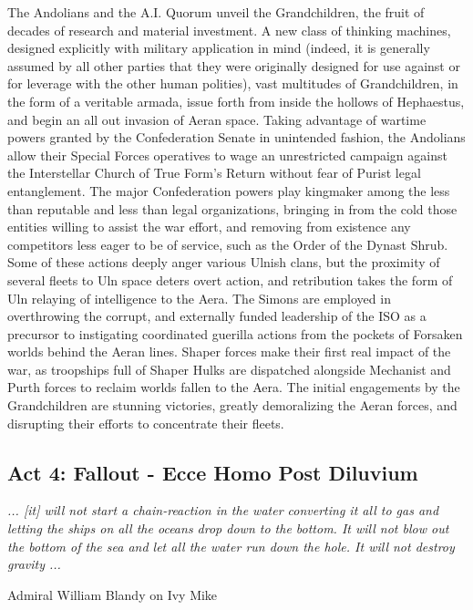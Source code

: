 The Andolians and the A.I. Quorum unveil the Grandchildren, the fruit
of decades of research and material investment. A new class of
thinking machines, designed explicitly with military application in
mind (indeed, it is generally assumed by all other parties that they
were originally designed for use against or for leverage with the
other human polities), vast multitudes of Grandchildren, in the form
of a veritable armada, issue forth from inside the hollows of
Hephaestus, and begin an all out invasion of Aeran space. Taking
advantage of wartime powers granted by the Confederation Senate in
unintended fashion, the Andolians allow their Special Forces
operatives to wage an unrestricted campaign against the Interstellar
Church of True Form's Return without fear of Purist legal
entanglement. The major Confederation powers play kingmaker among the
less than reputable and less than legal organizations, bringing in
from the cold those entities willing to assist the war effort, and
removing from existence any competitors less eager to be of service,
such as the Order of the Dynast Shrub. Some of these actions deeply
anger various Ulnish clans, but the proximity of several fleets to Uln
space deters overt action, and retribution takes the form of Uln
relaying of intelligence to the Aera. The Simons are employed in
overthrowing the corrupt, and externally funded leadership of the ISO
as a precursor to instigating coordinated guerilla actions from the
pockets of Forsaken worlds behind the Aeran lines. Shaper forces make
their first real impact of the war, as troopships full of Shaper Hulks
are dispatched alongside Mechanist and Purth forces to reclaim worlds
fallen to the Aera. The initial engagements by the Grandchildren are
stunning victories, greatly demoralizing the Aeran forces, and
disrupting their efforts to concentrate their fleets.

\subsection{Act 4: Fallout - Ecce Homo Post Diluvium}

\begin{center}
{\it ... [it] will not start a chain-reaction in the water converting it all to gas and letting the ships on all the oceans drop down to the bottom. It will not blow out the bottom of the sea and let all the water run down the hole. It will not destroy gravity ... } 

Admiral William Blandy on Ivy Mike
\end{center}

